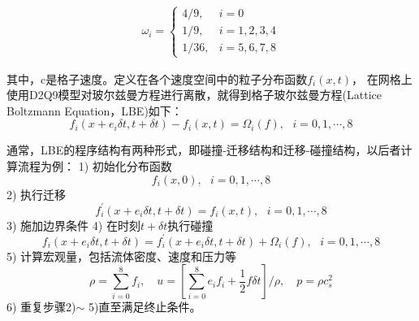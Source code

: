 \documentclass[UTF8]{ctexart}
\begin{document}
        \begin{equation}
        \begin{aligned}
            \omega_i = \left\{\begin{array}{lll}
                            4/9, &i=0 \\
                            1/9, &i=1,2,3,4\\
                            1/36, &i=5,6,7,8
                            \end{array}
                            \right.
        \end{aligned}
        \end{equation}

        其中，c是格子速度。定义在各个速度空间中的粒子分布函数${{f}_{i}}\left( x,t \right)$，
        在网格上使用D2Q9模型对玻尔兹曼方程进行离散，就得到格子玻尔兹曼方程(Lattice Boltzmann Equation，LBE)如下：
        \begin{equation}
            {{f}_{i}}\left( x+{{e}_{i}}\delta t,t+\delta t \right)-{{f}_{i}}\left( x,t \right)={{\Omega }_{i}}\left( f \right),\text{     }i=0,1,\cdots ,8
        \end{equation}

        通常，LBE的程序结构有两种形式，即碰撞-迁移结构和迁移-碰撞结构，以后者计算流程为例：
        1)	初始化分布函数
        \begin{equation}
            {{f}_{i}}\left( x,0 \right),\text{     }i=0,1,\cdots ,8
        \end{equation}
        2)	执行迁移
        \begin{equation}  
            f_{i}^{'}\left( x+{{e}_{i}}\delta t,t+\delta t \right)={{f}_{i}}\left( x,t \right),\text{     }i=0,1,\cdots ,8
        \end{equation}
        3)	施加边界条件
        4)	在时刻$t+\delta t$执行碰撞
        \begin{equation}
            {{f}_{i}}\left( x+{{e}_{i}}\delta t,t+\delta t \right)=f_{i}^{'}\left( x+{{e}_{i}}\delta t,t+\delta t \right)+{{\Omega }_{i}}\left( f \right),\text{     }i=0,1,\cdots ,8
        \end{equation}
        5)	计算宏观量，包括流体密度、速度和压力等
        \begin{equation}
            \rho =\sum\limits_{i=0}^{8}{{{f}_{i}}},\quad u=\left[ \sum\limits_{i=0}^{8}{{{e}_{i}}{{f}_{i}}+\frac{1}{2}f\delta t} \right]/\rho,\quad p=\rho c_{s}^{2}
        \end{equation}
        6)	重复步骤2)$\sim$ 5)直至满足终止条件。
\end{document}
